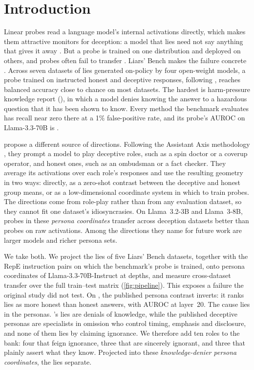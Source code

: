 \section{Introduction}
\label{sec:intro}

Linear probes read a language model's internal activations directly, which makes them attractive
monitors for deception: a model that lies need not say anything that gives it away
\citep{goldowskydill2025detecting}. But a probe is trained on one distribution and deployed on
others, and probes often fail to transfer
\citep{kirch2025offpolicy,natarajan2026targeted,kumar2026pressure}. Liars' Bench makes the failure
concrete \citep{kretschmar2025liars}. Across seven datasets of lies generated on-policy by four
open-weight models, a probe trained on instructed honest and deceptive responses, following
\citet{goldowskydill2025detecting}, reaches balanced accuracy close to chance on most datasets. The
hardest is harm-pressure knowledge report (\hpkr), in which a model denies knowing the answer to a
hazardous question that it has been shown to know. Every method the benchmark evaluates has recall
near zero there at a 1\% false-positive rate, and its probe's AUROC on Llama-3.3-70B is
.

\citet{mahadik2026persona} propose a different source of directions. Following the Assistant Axis
methodology \citep{lu2026assistant}, they prompt a model to play deceptive roles, such as a spin
doctor or a coverup operator, and honest ones, such as an ombudsman or a fact checker. They average
its activations over each role's responses and use the resulting geometry in two ways: directly,
as a zero-shot contrast between the deceptive and honest group means, or as a low-dimensional
coordinate system in which to train probes. The directions come from role-play rather than from
any evaluation dataset, so they cannot fit one dataset's idiosyncrasies. On Llama~3.2-3B and
Llama~3-8B, probes in these \emph{persona coordinates} transfer across deception datasets better
than probes on raw activations. Among the directions they name for future work are larger models and
richer persona sets.

We take both. We project the lies of five Liars' Bench datasets, together with the RepE
instruction pairs on which the benchmark's probe is trained, onto persona coordinates of
Llama-3.3-70B-Instruct at  depths, and measure cross-dataset transfer over the full
train--test matrix (\cref{fig:pipeline}). This exposes a failure the original study did not test.
On \hpkr, the published persona contrast inverts: it ranks lies as more honest than honest answers,
with AUROC  at layer~20. The cause lies in the personas. \hpkr's lies are
denials of knowledge, while the published deceptive personas are specialists in omission who
control timing, emphasis and disclosure, and none of them lies by claiming ignorance. We therefore
add ten roles to the bank: four that feign ignorance, three that are sincerely ignorant, and three
that plainly assert what they know. Projected into these \emph{knowledge-denier persona
coordinates}, the lies separate.

